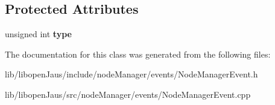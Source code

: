 \subsection*{\-Protected \-Attributes}
\begin{DoxyCompactItemize}
\item 
\hypertarget{class_node_manager_event_a5226c68beed38618d861a829e5ea2823}{unsigned int {\bfseries type}}\label{class_node_manager_event_a5226c68beed38618d861a829e5ea2823}

\end{DoxyCompactItemize}


\-The documentation for this class was generated from the following files\-:\begin{DoxyCompactItemize}
\item 
lib/libopen\-Jaus/include/node\-Manager/events/\-Node\-Manager\-Event.\-h\item 
lib/libopen\-Jaus/src/node\-Manager/events/\-Node\-Manager\-Event.\-cpp\end{DoxyCompactItemize}
